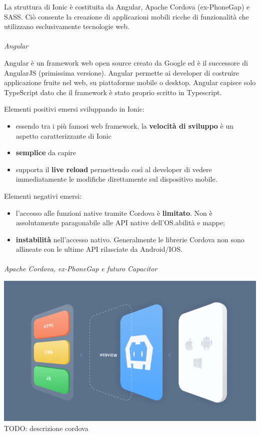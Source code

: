La struttura di Ionic è costituita da Angular, Apache Cordova (ex-PhoneGap) e SASS. Ciò consente la creazione di applicazioni mobili ricche di funzionalità che utilizzano esclusivamente tecnologie web.
\paragraph{}
\textit{Angular}

Angular è un framework web open source creato da Google ed è il successore di AngularJS (primissima versione).
Angular permette ai developer di costruire applicazione fruite nel web, su piattaforme mobile o desktop. 
Angular capisce solo TypeScript dato che il framework è stato proprio scritto in Typescript. 

Elementi positivi emersi sviluppando in Ionic:
\begin{itemize}
    \item essendo tra i più famosi web framework, la \textbf{velocità di sviluppo} è un aspetto caratterizzante di Ionic
    \item \textbf{semplice} da capire
    \item supporta il \textbf{live reload} permettendo così al developer di vedere immediatamente le modifiche direttamente sul dispositivo mobile.
\end{itemize}
    
Elementi negativi emersi:
\begin{itemize}
    \item l'accesso alle funzioni native tramite Cordova è \textbf{limitato}. Non è assolutamente paragonabile alle API native dell'OS.abilità e mappe;
    \item \textbf{instabilità} nell'accesso nativo. Generalmente le librerie Cordova non sono allineate con le ultime API rilasciate da Android/IOS.
\end{itemize}

\paragraph{}

\textit{Apache Cordova, ex-PhoneGap e futuro Capacitor}

\includegraphics[scale=0.50]{img/cap2/cordova}\\
TODO: descrizione cordova

